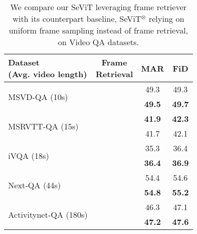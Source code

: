 \documentclass{article}
\newcommand{\cmark}{\ding{51}}\newcommand{\xmark}{\ding{55}}\DeclareMathOperator*{\argsort}{argsort}
\newcommand{\frameworkname}{SeViT}
\begin{document}
 \begin{table}[t!]
    \centering
    \small
    \caption{We compare our \frameworkname{} leveraging frame retriever with its counterpart baseline, \frameworkname{}$^{\otimes}$ relying on uniform frame sampling instead of frame retrieval, on Video QA datasets.}
    \vskip 0.15in
\begin{tabular}{lccc}
        \toprule
        \makecell{Dataset \\ \small{(Avg. video length)}} & \makecell{Frame \\ Retrieval} & MAR & FiD \\
        \midrule
        \multirow{2}{*}{MSVD-QA \small{(10s)}} & \xmark & 49.3 & 49.3 \\
        & \cmark & \textbf{49.5} & \textbf{49.7} \\
        \midrule
        \multirow{2}{*}{MSRVTT-QA \small{(15s)}} & \xmark & \textbf{41.9} & \textbf{42.3} \\
        & \cmark & 41.7 & 42.1 \\
        \midrule
        \multirow{2}{*}{iVQA \small{(18s)}} & \xmark & 35.3 & 36.4 \\
        & \cmark & \textbf{36.4} & \textbf{36.9} \\
        \midrule
        \multirow{2}{*}{Next-QA \small{(44s)}} & \xmark & 54.4 & 54.6 \\
        & \cmark & \textbf{54.8} & \textbf{55.2} \\
        \midrule
        \multirow{2}{*}{Activitynet-QA \small{(180s)}} & \xmark & 46.3 & 47.1 \\
        & \cmark & \textbf{47.2} & \textbf{47.6} \\
        \bottomrule
    \end{tabular}



\end{table}
\end{document}
